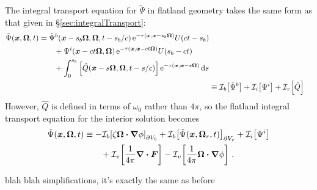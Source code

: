 The integral transport equation for $\tilde\Psi$ in flatland geometry takes the
same form as that given in \S\ref{sec:integralTransport}:
\begin{align*}
\begin{split}
  \tilde\Psi(\bm{x}, \bm{\Omega}, t)
  &=
  \tilde\Psi^b(\bm{x} - s_b\bm{\Omega}, \bm{\Omega}, t - s_b/c)
  \mathop{}\!\mathrm{e}^{ -\tau(\bm{x}, \bm{x} - s_b \bm{\Omega})}
  U(ct - s_b)
  \\
  &\qquad + \Psi^i( \bm{x} - ct \bm{\Omega}, \bm{\Omega})
  \mathop{}\!\mathrm{e}^{ -\tau(\bm{x}, \bm{x} - ct \bm{\Omega})}
  U( s_b - ct)
  \\
  &\qquad + \int_{0}^{s_b}
  \left[ \hat Q(\bm{x} - s \bm{\Omega}, \bm{\Omega}, t-s/c)
  \right]
  \mathop{}\!\mathrm{e}^{ -\tau(\bm{x}, \bm{x} - s \bm{\Omega})}
  \mathop{}\!\mathrm{d} s
\end{split}
  \\
    &\equiv \mathcal{I}_{b}\!\left[\tilde\Psi^b\right]
    + \mathcal{I}_{i}\!\left[\Psi^i\right]
    + \mathcal{I}_{v}\!\left[\hat Q\right]
\end{align*}
However, $\hat Q$ is defined in terms of $\omega_0$ rather than $4\pi$, so the
flatland integral transport equation for the interior solution becomes
\begin{align} \label{eq:inverseTransportBrief}
  \begin{split}
    \tilde\Psi(\bm{x}, \bm{\Omega}, t)
    &\equiv
    -\mathcal{I}_{b}\!\left[\zeta \bm{\Omega}\bm{\cdot} \bm{\nabla} \phi\right]_{\partial V_b}
    + \mathcal{I}_{b}\!\left[\tilde\Psi(\bm{x}, \bm{\Omega}_r, t)\right]_{\partial V_r}
    + \mathcal{I}_{i}\!\left[\Psi^i\right]
  \\&\qquad
    + \mathcal{I}_{v}\!\left[\frac{1}{4\pi} \bm{\nabla} \bm{\cdot}\bm{F} \right]
    - \mathcal{I}_{v}\!\left[\frac{1}{4\pi} \bm{\Omega}\bm{\cdot} \bm{\nabla} \phi\right]
    \,.
  \end{split}
\end{align}

blah blah simplifications, it's exactly the same as before

